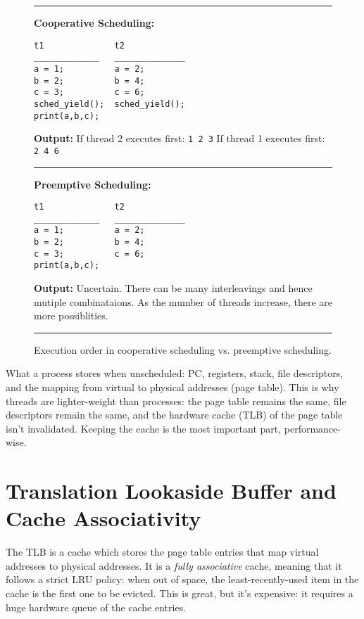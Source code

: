 \documentclass[twoside]{article}
\begin{document}
\begin{figure}[h]
\rule{\textwidth}{1pt}

\textbf{Cooperative Scheduling:}

\begin{verbatim}
t1              t2
_____________   ______________
a = 1;          a = 2;
b = 2;          b = 4;
c = 3;          c = 6;
sched_yield();  sched_yield();
print(a,b,c);
\end{verbatim}

\textbf{Output:}\newline
If thread 2 executes first: \texttt{1 2 3}\newline
If thread 1 executes first: \texttt{2 4 6}

\rule{\textwidth}{1pt}

\textbf{Preemptive Scheduling:}

\begin{verbatim}
t1              t2
_____________   ______________
a = 1;          a = 2;
b = 2;          b = 4;
c = 3;          c = 6;
print(a,b,c);
\end{verbatim}
 
\textbf{Output:}\newline
Uncertain. There can be many interleavings and hence mutiple combinataions. As the mumber of threads increase, there are more possiblities.

\rule{\textwidth}{1pt}

\caption{Execution order in cooperative scheduling vs. preemptive scheduling.}
\end{figure}

What a process stores when unscheduled: PC, registers, stack, file descriptors, and the mapping from virtual to physical addresses (page table). This is why threads are lighter-weight than processes: the page table remains the same, file descriptors remain the same, and the hardware cache (TLB) of the page table isn't invalidated. Keeping the cache is the most important part, performance-wise.

\section{Translation Lookaside Buffer and Cache Associativity}

The TLB is a cache which stores the page table entries that map virtual addresses to physical addresses. It is a \textit{fully associative} cache, meaning that it follows a strict LRU policy: when out of space, the least-recently-used item in the cache is the first one to be evicted. This is great, but it's expensive: it requires a huge hardware queue of the cache entries.
\end{document}
